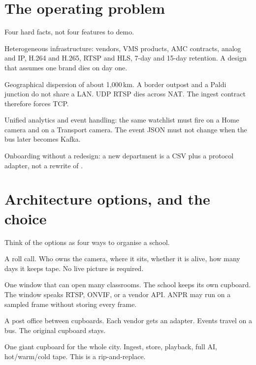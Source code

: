 \documentclass[listings]{csf301-notes}
\begin{document}
\section{The operating problem}
Four hard facts, not four features to demo.

Heterogeneous infrastructure: vendors, VMS products, AMC contracts, analog and IP, H.264 and H.265, RTSP and HLS, 7-day and 15-day retention. A design that assumes one brand dies on day one.

Geographical dispersion of about 1{,}000\,km. A border outpost and a Paldi junction do not share a LAN. UDP RTSP dies across NAT. The ingest contract therefore forces TCP.

Unified analytics and event handling: the same watchlist must fire on a Home camera and on a Transport camera. The event JSON must not change when the bus later becomes Kafka.

Onboarding without a redesign: a new department is a CSV plus a protocol adapter, not a rewrite of .

\section{Architecture options, and the choice}
Think of the options as four ways to organise a school.

\begin{definition}
A roll call. Who owns the camera, where it sits, whether it is alive, how many days it keeps tape. No live picture is required.
\end{definition}

\begin{definition}
One window that can open many classrooms. The school keeps its own cupboard. The window speaks RTSP, ONVIF, or a vendor API. ANPR may run on a sampled frame without storing every frame.
\end{definition}

\begin{definition}
A post office between cupboards. Each vendor gets an adapter. Events travel on a bus. The original cupboard stays.
\end{definition}

\begin{definition}
One giant cupboard for the whole city. Ingest, store, playback, full AI, hot/warm/cold tape. This is a rip-and-replace.
\end{definition}
\end{document}
